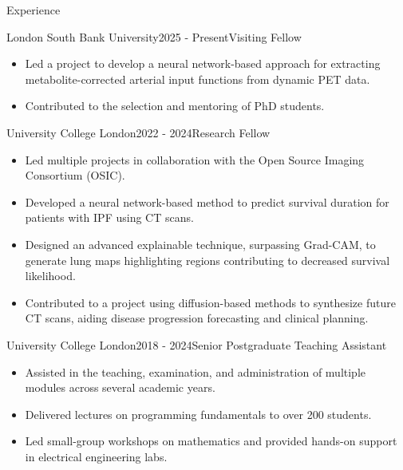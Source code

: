 \documentclass{cv}
\begin{document}
    \begin{rSection}{Experience}
        \item \begin{rSubsection}{London South Bank University}{2025 - Present}{Visiting Fellow}{}
            \item \begin{itemize}
                \item Led a project to develop a neural network-based approach for extracting metabolite-corrected arterial input functions from dynamic PET data.
                \item Contributed to the selection and mentoring of PhD students.
            \end{itemize}
        \end{rSubsection}
        
        \item \begin{rSubsection}{University College London}{2022 - 2024}{Research Fellow}{}
            \item \begin{itemize}
                \item Led multiple projects in collaboration with the Open Source Imaging Consortium (OSIC).
                \item Developed a neural network-based method to predict survival duration for patients with IPF using CT scans.
                \item Designed an advanced explainable technique, surpassing Grad-CAM, to generate lung maps highlighting regions contributing to decreased survival likelihood.
                \item Contributed to a project using diffusion-based methods to synthesize future CT scans, aiding disease progression forecasting and clinical planning.
            \end{itemize}
        \end{rSubsection}
        
        \item \begin{rSubsection}{University College London}{2018 - 2024}{Senior Postgraduate Teaching Assistant}{}
            \item \begin{itemize}
                \item Assisted in the teaching, examination, and administration of multiple modules across several academic years.
                \item Delivered lectures on programming fundamentals to over 200 students.
                \item Led small-group workshops on mathematics and provided hands-on support in electrical engineering labs.
            \end{itemize}
        \end{rSubsection}
        

\end{rSection}
\end{document}
